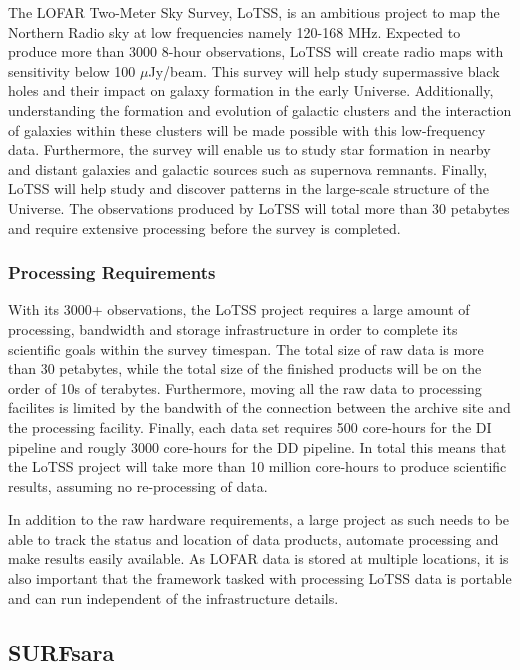 The LOFAR Two-Meter Sky Survey, LoTSS, is an ambitious project to map the Northern Radio sky at low frequencies namely 120-168 MHz. Expected to produce more than 3000 8-hour observations, LoTSS will create radio maps with sensitivity below 100 $\mu$Jy/beam. This survey will help study supermassive black holes and their impact on galaxy formation in the early Universe. Additionally, understanding the formation and evolution of galactic clusters and the interaction of galaxies within these clusters will be made possible with this low-frequency data. Furthermore, the survey will enable us to study star formation in nearby and distant galaxies and galactic sources such as supernova remnants. Finally, LoTSS will help study and discover patterns in the large-scale structure of the Universe.  The observations produced by LoTSS will total more than 30 petabytes and require extensive processing before the survey is completed. 

\subsubsection{Processing Requirements}   

With its 3000+ observations, the LoTSS project requires a large amount of processing, bandwidth and storage infrastructure in order to complete its scientific goals within the survey timespan. The total size of raw data is more than 30 petabytes, while the total size of the finished products will be on the order of 10s of terabytes. Furthermore, moving all the raw data to processing facilites is limited by the bandwith of the connection between the archive site and the processing facility. Finally, each data set requires 500 core-hours for the DI pipeline and rougly 3000 core-hours for the DD pipeline. In total this means that the LoTSS project will take more than 10 million core-hours to produce scientific results, assuming no re-processing of data. 
 
In addition to the raw hardware requirements, a large project as such needs to be able to track the status and location of data products, automate processing and make results easily available. As LOFAR data is stored at multiple locations, it is also important that the framework tasked with processing LoTSS data is portable and can run independent of the infrastructure details.

\subsection{SURFsara} 

